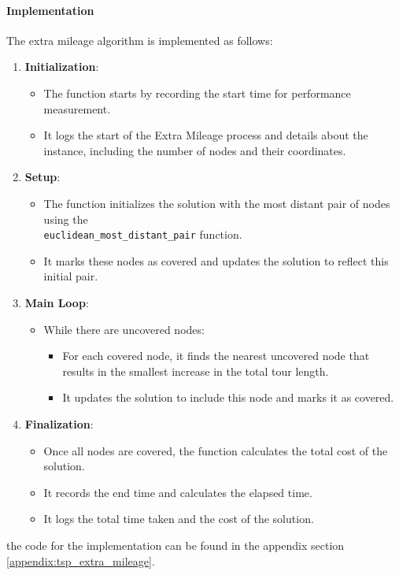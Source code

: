 \documentclass{article}
\begin{document}
\paragraph{Implementation}
The extra mileage algorithm is implemented as follows:
\begin{enumerate} \item \textbf{Initialization}: \begin{itemize} \item The function starts by recording the start time for performance measurement. \item It logs the start of the Extra Mileage process and details about the instance, including the number of nodes and their coordinates. \end{itemize}
	\item \textbf{Setup}:
	      \begin{itemize}
		      \item The function initializes the solution with the most distant pair of nodes using the \\
              \texttt{euclidean\_most\_distant\_pair} function.
		      \item It marks these nodes as covered and updates the solution to reflect this initial pair.
	      \end{itemize}

	\item \textbf{Main Loop}:
	      \begin{itemize}
		      \item While there are uncovered nodes:
		            \begin{itemize}
			            \item For each covered node, it finds the nearest uncovered node that results in the smallest increase in the total tour length.
			            \item It updates the solution to include this node and marks it as covered.
		            \end{itemize}
	      \end{itemize}

	\item \textbf{Finalization}:
	      \begin{itemize}
		      \item Once all nodes are covered, the function calculates the total cost of the solution.
		      \item It records the end time and calculates the elapsed time.
		      \item It logs the total time taken and the cost of the solution.
	      \end{itemize}
\end{enumerate}
the code for the implementation can be found in the appendix section \ref{appendix:tsp_extra_mileage}.
\end{document}

